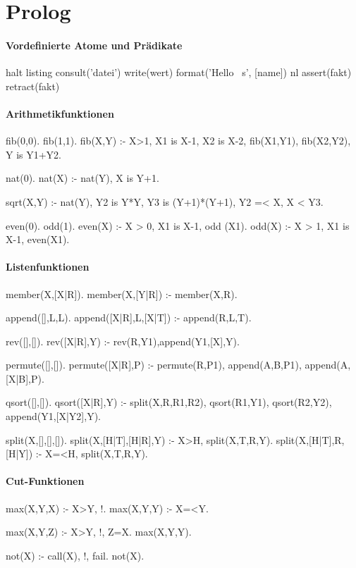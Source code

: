 \section*{Prolog}

\paragraph{Vordefinierte Atome und Prädikate}
\begin{prolog}
  halt %
  listing %
  consult('datei') %
  write(wert) %
  format('Hello ~s', [name]) %
  nl %
  assert(fakt) %
  retract(fakt) %
\end{prolog}

\paragraph{Arithmetikfunktionen}
\begin{prolog}
  fib(0,0).
  fib(1,1).
  fib(X,Y) :- X>1,
    X1 is X-1, X2 is X-2,
    fib(X1,Y1), fib(X2,Y2),
    Y is Y1+Y2.

  nat(0).
  nat(X) :- nat(Y), X is Y+1.

  sqrt(X,Y) :- nat(Y),
    Y2 is Y*Y, Y3 is (Y+1)*(Y+1),
    Y2 =< X, X < Y3.

  even(0).
  odd(1).
  even(X) :- X > 0, X1 is X-1, odd (X1).
  odd(X) :- X > 1, X1 is X-1, even(X1).
\end{prolog}

\paragraph{Listenfunktionen}
\begin{prolog}
  member(X,[X|R]).
  member(X,[Y|R]) :- member(X,R).

  append([],L,L).
  append([X|R],L,[X|T]) :- append(R,L,T).

  rev([],[]).
  rev([X|R],Y) :- rev(R,Y1),append(Y1,[X],Y).

  permute([],[]).
  permute([X|R],P) :-
    permute(R,P1),
    append(A,B,P1),
    append(A,[X|B],P).

  qsort([],[]).
  qsort([X|R],Y) :- split(X,R,R1,R2),
    qsort(R1,Y1),
    qsort(R2,Y2),
    append(Y1,[X|Y2],Y).

  split(X,[],[],[]).
  split(X,[H|T],[H|R],Y) :- X>H, split(X,T,R,Y).
  split(X,[H|T],R,[H|Y]) :- X=<H, split(X,T,R,Y).
\end{prolog}

\paragraph{Cut-Funktionen}
\begin{prolog}
  max(X,Y,X) :- X>Y, !.
  max(X,Y,Y) :- X=<Y.

  max(X,Y,Z) :- X>Y, !, Z=X.
  max(X,Y,Y).

  not(X) :- call(X), !, fail.
  not(X).
\end{prolog}